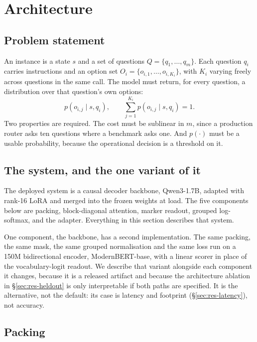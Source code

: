 \section{Architecture}
\label{sec:method}

\subsection{Problem statement}

An instance is a state $s$ and a set of questions $Q = \{q_1,\dots,q_m\}$.
Each question $q_i$ carries instructions and an option set $O_i =
\{o_{i,1},\dots,o_{i,K_i}\}$, with $K_i$ varying freely across questions in
the same call. The model must return, for every question, a distribution
over that question's own options:
\[
  p(o_{i,j} \mid s, q_i), \qquad \sum_{j=1}^{K_i} p(o_{i,j}\mid s,q_i) = 1 .
\]
Two properties are required. The cost must be sublinear in $m$, since a
production router asks ten questions where a benchmark asks one. And
$p(\cdot)$ must be a usable probability, because the operational decision
is a threshold on it.

\subsection{The system, and the one variant of it}
\label{sec:method-system}

The deployed system is a causal decoder backbone, Qwen3-1.7B, adapted with
rank-16 LoRA and merged into the frozen weights at load. The five
components below are packing, block-diagonal attention, marker readout,
grouped log-softmax, and the adapter. Everything in this section describes
that system.

One component, the backbone, has a second implementation. The same
packing, the same mask, the same grouped normalisation and the same loss
run on a 150M bidirectional encoder, ModernBERT-base, with a linear scorer
in place of the vocabulary-logit readout. We describe that variant
alongside each component it changes, because it is a released artifact and
because the architecture ablation in \S\ref{sec:res-heldout} is only
interpretable if both paths are specified. It is the alternative, not the
default: its case is latency and footprint (\S\ref{sec:res-latency}), not
accuracy.

\subsection{Packing}

